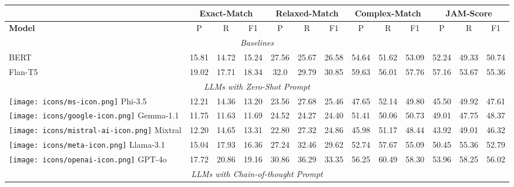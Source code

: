 \begin{table*}[h!]
\small
\centering
\renewcommand*{\arraystretch}{1.1}

\begin{tabular}{l|ccc|ccc|ccc|ccc}
 & \multicolumn{3}{c}{\textbf{Exact-Match}}& \multicolumn{3}{c}{\textbf{Relaxed-Match}} & \multicolumn{3}{c}{\textbf{Complex-Match}}& \multicolumn{3}{c}{\textbf{JAM-Score}} \\
\midrule
\textbf{Model}& P & R & F1 & P & R & F1  & P & R & F1 & P & R & F1\\
\midrule

\multicolumn{13}{c}{\textit{Baselines}}\\
\midrule
BERT & 15.81 & 14.72 & 15.24 & 27.56 & 25.67 & 26.58 & 54.64 & 51.62 & 53.09 & 52.24 & 49.33 & 50.74\\

Flan-T5 & 19.02 & 17.71 & 18.34 & 32.0 & 29.79 & 30.85 & 59.63 & 56.01 & 57.76 & 57.16 & 53.67 & 55.36\\

\midrule
\multicolumn{13}{c}{\textit{LLMs with Zero-Shot Prompt}}\\
\midrule

\texttt{[image: icons/ms-icon.png]} Phi-3.5 & 12.21 & 14.36 & 13.20 & 23.56 & 27.68 & 25.46 & 47.65 & 52.14 & 49.80 & 45.50 & 49.92 & 47.61 \\
\texttt{[image: icons/google-icon.png]} Gemma-1.1 & 11.75 & 11.63 & 11.69 & 24.52 & 24.27 & 24.40 & 51.41 & 50.06 & 50.73 & 49.01 & 47.75 & 48.37 \\
\texttt{[image: icons/mistral-ai-icon.png]} Mixtral & 12.20 & 14.65 & 13.31 & 22.80 & 27.32 & 24.86 & 45.98 & 51.17 & 48.44 & 43.92 & 49.01 & 46.32 \\
\texttt{[image: icons/meta-icon.png]} Llama-3.1 & 15.04 & 17.93 & 16.36 & 27.24 & 32.46 & 29.62 & 52.74 & 57.67 & 55.09 & 50.45 & 55.36 & 52.79 \\
\texttt{[image: icons/openai-icon.png]} GPT-4o & 17.72 & 20.86 & 19.16 & 30.86 & 36.29 & 33.35 & 56.25 & 60.49 & 58.30 & 53.96 & 58.25 & 56.02 \\

\midrule
\multicolumn{13}{c}{\textit{LLMs with Chain-of-thought Prompt}}\\
\midrule


\end{tabular}
\end{table*}
